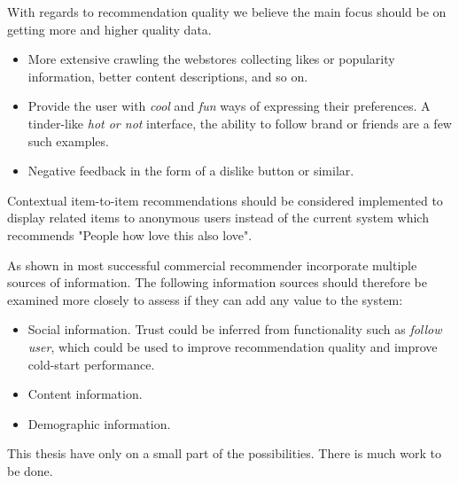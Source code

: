 With regards to recommendation quality we believe the main focus should be on getting more
and higher quality data.

\begin{itemize}
\item More extensive crawling the webstores collecting likes or popularity information, better content descriptions,
	  and so on.
\item Provide the user with \emph{cool} and \emph{fun} ways of expressing their preferences. A tinder-like \emph{hot or not}
	  interface, the ability to follow brand or friends are a few such examples.
\item Negative feedback in the form of a dislike button or similar.
\end{itemize}


Contextual item-to-item recommendations should be considered implemented to display related
items to anonymous users instead of the current system which recommends "People how love this also love".





As shown in \cite{FranceTelecom} most successful commercial recommender incorporate multiple
sources of information. The following information sources should therefore be examined more
closely to assess if they can add any value to the system:

\begin{itemize}
\item Social information. Trust could be inferred from functionality such as \emph{follow user}, which
	  could be used to improve recommendation quality and improve cold-start performance.
\item Content information.
\item Demographic information.
\end{itemize}




This thesis have only on a small part of the possibilities. There is much work to be done. %

